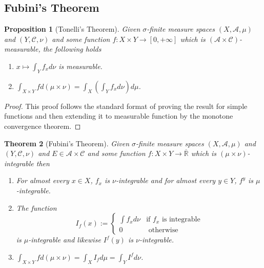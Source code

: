 \documentclass[11pt]{article}
\newcommand{\defeq}{:=}
\newcommand{\R}{\mathbb{R}}
\newtheorem{theorem}{Theorem}[section]
\newtheorem{prop}[theorem]{Proposition}
\begin{document}
\subsection{Fubini's Theorem}
\begin{prop}[Tonelli's Theorem]
Given $\sigma$-finite measure spaces $(X, \mathcal{A}, \mu)$ and $(Y, \mathcal{C}, \nu)$ and some function $f:X\times Y \to [0, +\infty]$ which is $(\mathcal{A}\times \mathcal{C})$-measurable, the following holds
\begin{enumerate}[label=(\alph*)]
	\item $x\mapsto \int_Y f_x d\nu$ is measurable.
	\item $\int_{X\times Y} f d(\mu\times\nu)=\int_X\left(\int_Y f_x d\nu\right)d\mu$.
\end{enumerate}
\end{prop}
\begin{proof}
This proof follows the standard format of proving the result for simple functions and then extending it to measurable function by the monotone convergence theorem.
\end{proof}
\begin{theorem}[Fubini's Theorem]
Given $\sigma$-finite measure spaces $(X, \mathcal{A}, \mu)$ and $(Y, \mathcal{C}, \nu)$ and $E\in\mathcal{A}\times \mathcal{C}$ and some function $f:X\times Y \to \overline{\R}$ which is $(\mu\times\nu)$-integrable then
\begin{enumerate}[label=(\alph*)]
	\item For almost every $x\in X$, $f_x$ is $\nu$-integrable and for almost every $y\in Y$, $f^y$ is $\mu$-integrable.
	\item The function
		\[
			I_f(x)\defeq
			\begin{cases}
				\int f_x d\nu & \text{if }f_x\text{ is integrable}\\
				0 & \text{ otherwise}
			\end{cases}
		\]
		is $\mu$-integrable and likewise $I^f(y)$ is $\nu$-integrable.
	\item $\int_{X\times Y} f d(\mu\times\nu)=\int_X I_f d\mu = \int_Y I^f d \nu$.
\end{enumerate}
\end{theorem}
\end{document}
